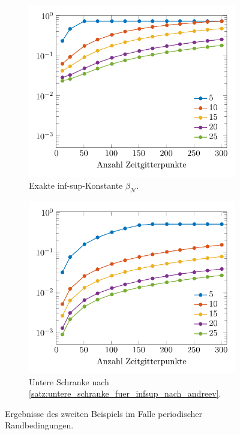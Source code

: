 \documentclass[../main.tex]{subfiles}
\begin{document}
\begin{figure}[p]
    \centering
    \centering
    \begin{subfigure}[b]{0.495\textwidth}
        \centering
        \includegraphics[width=1\textwidth]{figures/chapter4/stability_fourier_dataset1_fig_1.pdf}
        \caption{Exakte inf-sup-Konstante $\beta_{\mathcal N}$.}
    \end{subfigure}
    \begin{subfigure}[b]{0.495\textwidth}
        \centering
        \includegraphics[width=1\textwidth]{figures/chapter4/stability_fourier_dataset1_fig_2.pdf}
        \caption{Untere Schranke nach \cref{satz:untere_schranke_fuer_infsup_nach_andreev}.}
    \end{subfigure}
    \caption[Stabilität der Diskretisierung mit periodisches Randbedingungen.]{%
        Ergebnisse des zweiten Beispiels im Falle periodischer Randbedingungen.
        }
    \label{figure:infsup_periodisch_zwei_felder}
\end{figure}
\end{document}
